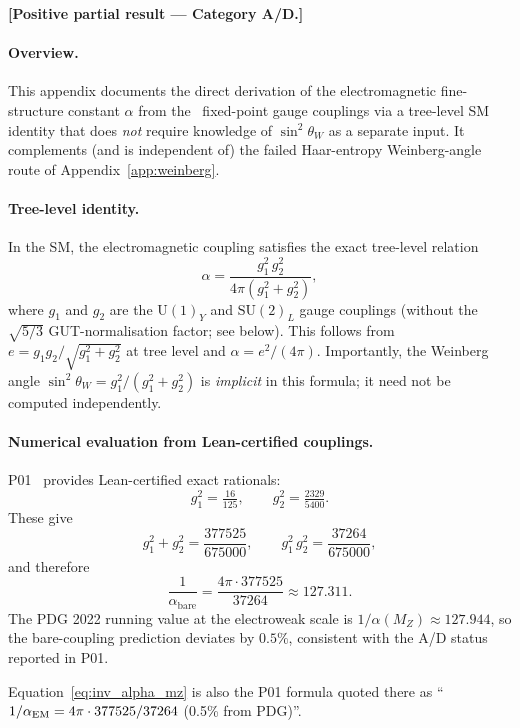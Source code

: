 \documentclass[11pt]{article}
\theoremstyle{remark}
\newcommand{\SRRG}{\text{SRRG}}
\begin{document}
\begin{appendices}
\noindent\textbf{[Positive partial result --- Category A/D.]}

\paragraph{Overview.}
This appendix documents the direct derivation of the electromagnetic fine-structure
constant $\alpha$ from the \SRRG\ fixed-point gauge couplings via a tree-level
SM identity that does \emph{not} require knowledge of $\sin^2\theta_W$ as a
separate input.  It complements (and is independent of) the failed Haar-entropy
Weinberg-angle route of Appendix~\ref{app:weinberg}.

\paragraph{Tree-level identity.}
In the SM, the electromagnetic coupling satisfies the exact tree-level relation
\begin{equation}\label{eq:alpha_tree}
  \alpha = \frac{g_1^2\, g_2^2}{4\pi(g_1^2 + g_2^2)},
\end{equation}
where $g_1$ and $g_2$ are the $\mathrm{U}(1)_Y$ and $\mathrm{SU}(2)_L$ gauge
couplings (without the $\sqrt{5/3}$ GUT-normalisation factor; see below).
This follows from $e = g_1 g_2/\sqrt{g_1^2+g_2^2}$ at tree level and
$\alpha = e^2/(4\pi)$.  Importantly, the Weinberg angle $\sin^2\theta_W =
g_1^2/(g_1^2+g_2^2)$ is \emph{implicit} in this formula; it need not be
computed independently.

\paragraph{Numerical evaluation from Lean-certified couplings.}
P01~\cite{Spivack2025_FirstPrinciplesSM} provides Lean-certified exact rationals:
\[
  g_1^2 = \tfrac{16}{125},\qquad g_2^2 = \tfrac{2329}{5400}.
\]
These give
\[
  g_1^2 + g_2^2 = \frac{377525}{675000}, \qquad
  g_1^2\, g_2^2  = \frac{37264}{675000},
\]
and therefore
\begin{equation}\label{eq:inv_alpha_mz}
  \frac{1}{\alpha_{\mathrm{bare}}}
  = \frac{4\pi \cdot 377525}{37264}
  \approx 127.311.
\end{equation}
The PDG 2022 running value at the electroweak scale is
$1/\alpha(M_Z) \approx 127.944$, so the bare-coupling prediction deviates by
$0.5\%$, consistent with the A/D status reported in P01.

\noindent
Equation~\eqref{eq:inv_alpha_mz} is also the P01 formula quoted there
as ``$1/\alpha_{\rm EM} = 4\pi \cdot 377525/37264$ (0.5\% from PDG)''.


\end{appendices}
\end{document}
